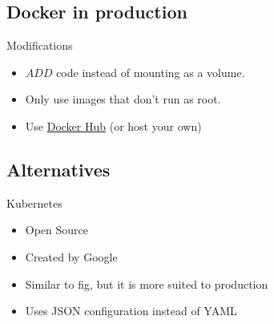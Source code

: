 \documentclass{beamer}
\begin{document}
    \subsection{Docker in production}
    \begin{frame}{Modifications}
        \begin{itemize}
            \item $ADD$ code instead of mounting as a volume.
            \item Only use images that don't run as root.
            \item Use \href{https://registry.hub.docker.com/}{Docker Hub} (or host your own)
        \end{itemize}
    \end{frame}
    \subsection{Alternatives}
    \begin{frame}{Kubernetes}
        \begin{itemize}
            \item Open Source
            \item Created by Google
            \item Similar to fig, but it is more suited to production
            \item Uses JSON configuration instead of YAML
        \end{itemize}
    \end{frame}
\end{document}
